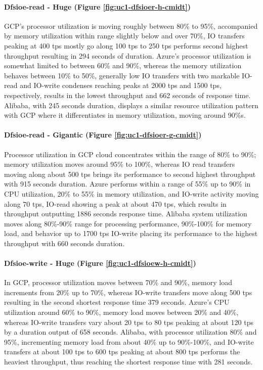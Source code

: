 \documentclass[review]{elsarticle}
\begin{document}
\paragraph{Dfsioe-read - Huge (Figure \ref{fig:uc1-dfsioer-h-cmidt})}GCP's processor utilization is moving roughly between 80\% to 95\%, accompanied by memory utilization within range slightly below and over 70\%, IO transfers peaking at 400 tps mostly go along 100 tps to 250 tps performs second highest throughput resulting in 294 seconds of duration. Azure's processor utilization is somewhat limited to between 60\% and 90\%, whereas the memory utilization behaves between 10\% to 50\%, generally low IO transfers with two markable IO-read and IO-write condenses reaching peaks at 2000 tps and 1500 tps, respectively, results in the lowest throughput and 662 seconds of response time. Alibaba, with 245 seconds duration, displays a similar resource utilization pattern with GCP where it differentiates in memory utilization, moving around 90\%s.

\paragraph{Dfsioe-read - Gigantic (Figure \ref{fig:uc1-dfsioer-g-cmidt})}Processor utilization in GCP cloud concentrates within the range of 80\% to 90\%; memory utilization moves around 95\% to 100\%, whereas IO read transfers moving along about 500 tps brings its performance to second highest throughput with 915 seconds duration. Azure performs within a range of 55\% up to 90\% in CPU utilization, 20\% to 55\% in memory utilization, and IO-write activity moving along 70 tps, IO-read showing a peak at about 470 tps, which results in throughput outputting 1886 seconds response time. Alibaba system utilization moves along 80\%-90\% range for processing performance, 90\%-100\% for memory load, and behavior up to 1700 tps IO-write placing its performance to the highest throughput with 660 seconds duration.

\paragraph{Dfsioe-write - Huge (Figure \ref{fig:uc1-dfsioew-h-cmidt})}In GCP, processor utilization moves between 70\% and 90\%, memory load increments from 20\% up to 70\%, whereas IO-write transfers move along 500 tps resulting in the second shortest response time 379 seconds. Azure's CPU utilization around 60\% to 90\%, memory load moves between 20\% and 40\%, whereas IO-write transfers vary about 20 tps to 80 tps peaking at about 120 tps by a duration output of 658 seconds. Alibaba, with processor utilization 80\% and 95\%, incrementing memory load from about 40\% up to 90\%-100\%, and IO-write transfers at about 100 tps to 600 tps peaking at about 800 tps performs the heaviest throughput, thus reaching the shortest response time with 281 seconds.
\end{document}
